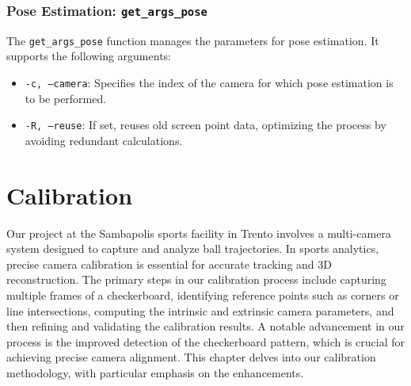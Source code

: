 \documentclass{template}
\begin{document}
\subsection{Pose Estimation: \texttt{get\_args\_pose}}

The \texttt{get\_args\_pose} function manages the parameters for pose estimation. It supports the following arguments:

\begin{itemize}
    \item \texttt{-c, --camera}: Specifies the index of the camera for which pose estimation is to be performed. 
    \item \texttt{-R, --reuse}: If set, reuses old screen point data, optimizing the process by avoiding redundant calculations.
\end{itemize}

\chapter{Calibration}\label{ch:in}
Our project at the Sambapolis sports facility in Trento involves a multi-camera system designed to capture and analyze ball trajectories. In sports analytics, precise camera calibration is essential for accurate tracking and 3D reconstruction. The primary steps in our calibration process include capturing multiple frames of a checkerboard, identifying reference points such as corners or line intersections, computing the intrinsic and extrinsic camera parameters, and then refining and validating the calibration results.
A notable advancement in our process is the improved detection of the checkerboard pattern, which is crucial for achieving precise camera alignment. This chapter delves into our calibration methodology, with particular emphasis on the enhancements.
\end{document}
